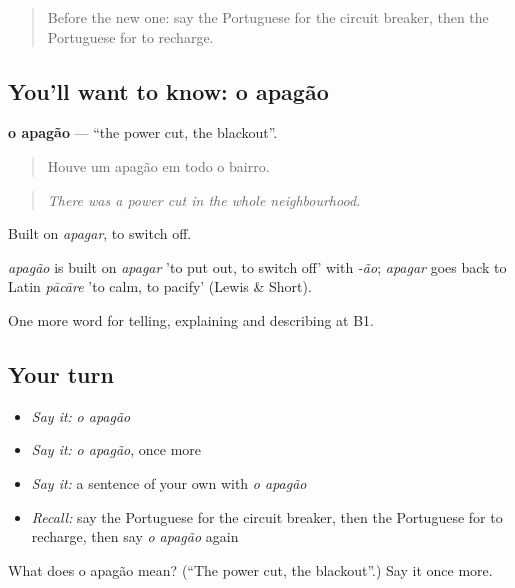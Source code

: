 \label{lesson:PT-C432-apagao}



\begin{quote}
Before the new one: say the Portuguese for the circuit breaker, then the Portuguese for to recharge.
\end{quote}

\subsection*{You'll want to know: o apagão}
\textbf{o apagão} — \textquotedblleft{}the power cut, the blackout\textquotedblright{}.

\begin{quote}
Houve um apagão em todo o bairro.
\end{quote}

\begin{quote}
\emph{There was a power cut in the whole neighbourhood.}
\end{quote}

Built on \emph{apagar}, to switch off.

\begin{cousinweb}
\emph{apagão} is built on \emph{apagar} 'to put out, to switch off' with \emph{-ão}; \emph{apagar} goes back to Latin \emph{pācāre} 'to calm, to pacify' (Lewis \& Short).
\end{cousinweb}

\begin{grammarlens}[title={What you've built}]
One more word for telling, explaining and describing at B1.
\end{grammarlens}

\subsection*{Your turn}
\begin{itemize}
\raggedright
  \item \emph{Say it:} \emph{o apagão}
  \item \emph{Say it:} \emph{o apagão}, once more
  \item \emph{Say it:} a sentence of your own with \emph{o apagão}
  \item \emph{Recall:} say the Portuguese for the circuit breaker, then the Portuguese for to recharge, then say \emph{o apagão} again
\end{itemize}

\begin{tcolorbox}[breakable,colback=teal!4,colframe=teal!35!black,title={Before you move on}]
What does o apagão mean? (\textquotedblleft{}The power cut, the blackout\textquotedblright{}.) Say it once more.
\end{tcolorbox}
